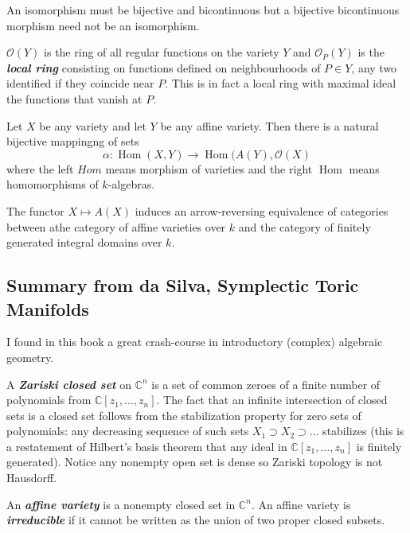 \begin{remark}
	An isomorphism must be bijective and bicontinuous but a bijective bicontinuous morphism need not be an isomorphism.
\end{remark}

\begin{defn}
	$\mathcal{O}(Y)$ is the ring of all regular functions on the variety $Y$ and $\mathcal{O}_P(Y)$ is the \textit{\textbf{local ring}} consisting on functions defined on neighbourhoods of $P\in Y$, any two identified if they coincide near $P$. This is in fact a local ring with maximal ideal the functions that vanish at $P$.
\end{defn}

\begin{prop}[3.5]\leavevmode
	Let $X$ be any variety and let $Y$ be any affine variety. Then there is a natural bijective mappingng of sets
	\[\alpha:\operatorname{Hom}(X,Y)\to \operatorname{Hom}(A(Y),\mathcal{O}(X) \]
	where the left $Hom$ means morphism of varieties and the right  $ \operatorname{Hom}$ means homomorphisms of $k$-algebras.
\end{prop}

	\begin{coro}[3.8]
		The functor $X\mapsto A(X)$ induces an arrow-reversing equivalence of categories between athe category of affine varieties over $k$ and the category of finitely generated integral domains over  $k$.
	\end{coro}

\subsection{Summary from da Silva, Symplectic Toric Manifolds}

I found in this book a great crash-course in introductory (complex) algebraic geometry.

A \textit{\textbf{Zariski closed set}} on  $\mathbb{C}^{n}$ is a set of common zeroes of a finite number of polynomials from $\mathbb{C}[z_1,\ldots,z_n]$. The fact that an infinite intersection of closed sets is a closed set follows from the stabilization property for zero sets of polynomials: any decreasing sequence of such sets $X_1\supset X_2\supset\ldots$ stabilizes (this is a restatement of Hilbert's basis theorem that any ideal in $\mathbb{C}[z_1,\ldots,z_n]$ is finitely generated). Notice any nonempty open set is dense so Zariski topology is not Hausdorff.

\begin{defn}
	An \textit{\textbf{affine variety}} is a nonempty closed set in $\mathbb{C}^{n}$. An affine variety is \textit{\textbf{irreducible}} if it cannot be written as the union of two proper closed subsets.
\end{defn}

